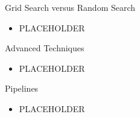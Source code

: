 \documentclass[11pt,compress,t,notes=noshow, xcolor=table]{beamer}
\begin{document}
	
	\begin{vbframe}{Grid Search versus Random Search}
		\begin{itemize}
			\item PLACEHOLDER
		\end{itemize}
	\end{vbframe}


	\begin{vbframe}{Advanced Techniques}
		\begin{itemize}
			\item PLACEHOLDER
		\end{itemize}
	\end{vbframe}


	\begin{vbframe}{Pipelines}
		\begin{itemize}
			\item PLACEHOLDER
		\end{itemize}
	\end{vbframe}


	\endlecture
\end{document}
